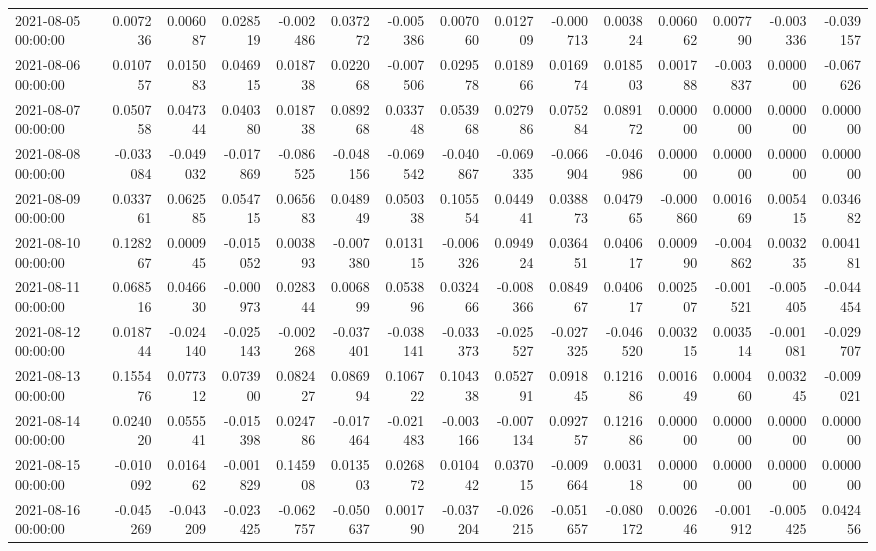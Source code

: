 \begin{tabular}{lrrrrrrrrrrrrrr}
2021-08-05 00:00:00 & 0.007236 & 0.006087 & 0.028519 & -0.002486 & 0.037272 & -0.005386 & 0.007060 & 0.012709 & -0.000713 & 0.003824 & 0.006062 & 0.007790 & -0.003336 & -0.039157 \\
2021-08-06 00:00:00 & 0.010757 & 0.015083 & 0.046915 & 0.018738 & 0.022068 & -0.007506 & 0.029578 & 0.018966 & 0.016974 & 0.018503 & 0.001788 & -0.003837 & 0.000000 & -0.067626 \\
2021-08-07 00:00:00 & 0.050758 & 0.047344 & 0.040380 & 0.018738 & 0.089268 & 0.033748 & 0.053968 & 0.027986 & 0.075284 & 0.089172 & 0.000000 & 0.000000 & 0.000000 & 0.000000 \\
2021-08-08 00:00:00 & -0.033084 & -0.049032 & -0.017869 & -0.086525 & -0.048156 & -0.069542 & -0.040867 & -0.069335 & -0.066904 & -0.046986 & 0.000000 & 0.000000 & 0.000000 & 0.000000 \\
2021-08-09 00:00:00 & 0.033761 & 0.062585 & 0.054715 & 0.065683 & 0.048949 & 0.050338 & 0.105554 & 0.044941 & 0.038873 & 0.047965 & -0.000860 & 0.001669 & 0.005415 & 0.034682 \\
2021-08-10 00:00:00 & 0.128267 & 0.000945 & -0.015052 & 0.003893 & -0.007380 & 0.013115 & -0.006326 & 0.094924 & 0.036451 & 0.040617 & 0.000990 & -0.004862 & 0.003235 & 0.004181 \\
2021-08-11 00:00:00 & 0.068516 & 0.046630 & -0.000973 & 0.028344 & 0.006899 & 0.053896 & 0.032466 & -0.008366 & 0.084967 & 0.040617 & 0.002507 & -0.001521 & -0.005405 & -0.044454 \\
2021-08-12 00:00:00 & 0.018744 & -0.024140 & -0.025143 & -0.002268 & -0.037401 & -0.038141 & -0.033373 & -0.025527 & -0.027325 & -0.046520 & 0.003215 & 0.003514 & -0.001081 & -0.029707 \\
2021-08-13 00:00:00 & 0.155476 & 0.077312 & 0.073900 & 0.082427 & 0.086994 & 0.106722 & 0.104338 & 0.052791 & 0.091845 & 0.121686 & 0.001649 & 0.000460 & 0.003245 & -0.009021 \\
2021-08-14 00:00:00 & 0.024020 & 0.055541 & -0.015398 & 0.024786 & -0.017464 & -0.021483 & -0.003166 & -0.007134 & 0.092757 & 0.121686 & 0.000000 & 0.000000 & 0.000000 & 0.000000 \\
2021-08-15 00:00:00 & -0.010092 & 0.016462 & -0.001829 & 0.145908 & 0.013503 & 0.026872 & 0.010442 & 0.037015 & -0.009664 & 0.003118 & 0.000000 & 0.000000 & 0.000000 & 0.000000 \\
2021-08-16 00:00:00 & -0.045269 & -0.043209 & -0.023425 & -0.062757 & -0.050637 & 0.001790 & -0.037204 & -0.026215 & -0.051657 & -0.080172 & 0.002646 & -0.001912 & -0.005425 & 0.042456 \\

\end{tabular}
